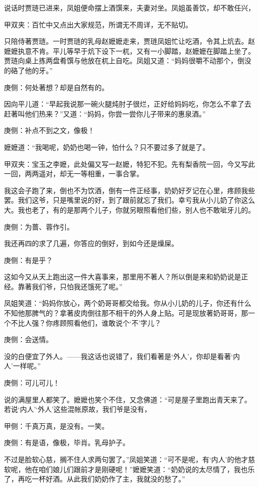 \begin{parag}
    说话时贾琏已进来，凤姐便命摆上酒馔来，夫妻对坐。凤姐虽善饮，却不敢任兴，\begin{note}甲双夹：百忙中又点出大家规范，所谓无不周详，无不贴切。\end{note}只陪侍著贾琏。一时贾琏的乳母赵嬷嬷走来，贾琏凤姐忙让吃酒，令其上炕去。赵嬷嬷执意不肯。平儿等早于炕下设下一杌，又有一小脚踏，赵嬷嬷在脚踏上坐了。贾琏向桌上拣两盘肴馔与他放在杌上自吃。凤姐又道：“妈妈很嚼不动那个，倒没的硌了他的牙。”\begin{note}庚侧：何处著想？却是自然有的。\end{note}因向平儿道：“早起我说那一碗火腿炖肘子很烂，正好给妈妈吃，你怎么不拿了去赶著叫他们热来？”又道：“妈妈，你尝一尝你儿子带来的惠泉酒。”\begin{note}庚侧：补点不到之文，像极！\end{note}嬷嬷道：“我喝呢，奶奶也喝一钟，怕什么？只不要过多了就是了。\begin{note}甲双夹：宝玉之李嬷，此处偏又写一赵嬷，特犯不犯。先有梨香院一回，今又写此一回，两两遥对，却无一等相重，一事合掌。\end{note}我这会子跑了来，倒也不为饮酒，倒有一件正经事，奶奶好歹记在心里，疼顾我些罢。我们这爷，只是嘴里说的好，到了跟前就忘了我们。幸亏我从小儿奶了你这么大。我也老了，有的是那两个儿子，你就另眼照看他们些，别人也不敢呲牙儿的。\begin{note}庚侧：为蔷、蓉作引。\end{note}我还再四的求了几遍，你答应的倒好，到如今还是燥屎。\begin{note}庚侧：有是乎？\end{note}这如今又从天上跑出这一件大喜事来，那里用不著人？所以倒是来和奶奶说是正经。靠著我们爷，只怕我还饿死了呢。”
\end{parag}


\begin{parag}
    凤姐笑道：“妈妈你放心，两个奶哥哥都交给我。你从小儿奶的儿子，你还有什么不知他那脾气的？拿著皮肉倒往那不相干的外人身上贴。可是现放著奶哥哥，那一个不比人强？你疼顾照看他们，谁敢说个‘不’字儿？\begin{note}庚侧：会送情。\end{note}没的白便宜了外人。——我这话也说错了，我们看著是‘外人’，你却是看著‘内人’一样呢。”\begin{note}庚侧：可儿可儿！\end{note}说的满屋里人都笑了。嬷嬷也笑个不住，又念佛道：“可是屋子里跑出青天来了。若说‘内人’‘外人’这些混帐原故，我们爷是没有，\begin{note}甲侧：千真万真，是没有。一笑。\end{note}\begin{note}庚侧：有是语，像极，毕肖。乳母护子。\end{note}不过是脸软心慈，搁不住人求两句罢了。”凤姐笑道：“可不是呢，有‘内人’的他才慈软呢，他在咱们娘儿们跟前才是刚硬呢！”嬷嬷笑道：“奶奶说的太尽情了，我也乐了，再吃一杯好酒。从此我们奶奶作了主，我就没的愁了。”
\end{parag}


